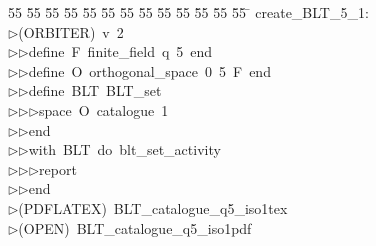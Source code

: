 %
%
\begin{tabbing}
55 \= 55 \= 55 \= 55 \= 55 \= 55 \= 55 \= 55 \= 55 \= 55 \= 55 \= 55 \= 55 \= \kill
create\_BLT\_5\_1:\\[0pt]
$\triangleright$\>(ORBITER)\ v\ 2\ \\[0pt]
$\triangleright$\>$\triangleright$\>define\ F\ finite\_field\ q\ 5\ end\ \\[0pt]
$\triangleright$\>$\triangleright$\>define\ O\ orthogonal\_space\ 0\ 5\ F\ end\ \\[0pt]
$\triangleright$\>$\triangleright$\>define\ BLT\ BLT\_set\ \\[0pt]
$\triangleright$\>$\triangleright$\>$\triangleright$\>space\ O\ catalogue\ 1\ \\[0pt]
$\triangleright$\>$\triangleright$\>end\ \\[0pt]
$\triangleright$\>$\triangleright$\>with\ BLT\ do\ blt\_set\_activity\ \\[0pt]
$\triangleright$\>$\triangleright$\>$\triangleright$\>report\ \\[0pt]
$\triangleright$\>$\triangleright$\>end\\[0pt]
$\triangleright$\>(PDFLATEX)\ BLT\_catalogue\_q5\_iso1tex\\[0pt]
$\triangleright$\>(OPEN)\ BLT\_catalogue\_q5\_iso1pdf\\[0pt]
\end{tabbing}
